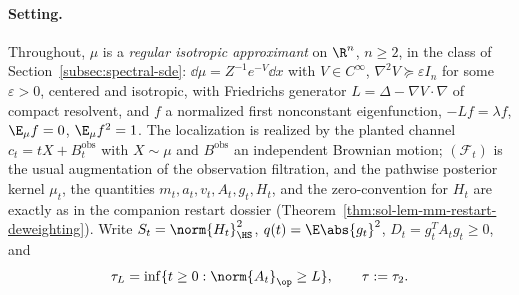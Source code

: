 \documentclass[../main.tex]{subfiles}
\begin{document}
\paragraph{Setting.}
Throughout, $\mu$ is a \emph{regular isotropic approximant} on $\R^n$, $n\ge2$, in the
class of Section~\ref{subsec:spectral-sde}: $\dd\mu=Z^{-1}e^{-V}\dd x$ with
$V\in C^\infty$, $\nabla^2V\succeq\varepsilon I_n$ for some $\varepsilon>0$, centered
and isotropic, with Friedrichs generator $L=\Delta-\nabla V\cdot\nabla$ of compact
resolvent, and $f$ a normalized first nonconstant eigenfunction, $-Lf=\lambda f$,
$\E_\mu f=0$, $\E_\mu f^2=1$.  The localization is realized by the planted channel
$c_t=tX+B_t^{\mathrm{obs}}$ with $X\sim\mu$ and $B^{\mathrm{obs}}$ an independent
Brownian motion; $(\mathcal F_t)$ is the usual augmentation of the observation
filtration, and the pathwise posterior kernel $\mu_t$, the quantities
$m_t,a_t,v_t,A_t,g_t,H_t$, and the zero-convention for $H_t$ are exactly as in the
companion restart dossier (Theorem~\ref{thm:sol-lem-mm-restart-deweighting}).  Write
$S_t=\norm{H_t}_{\HS}^2$, $q(t)=\E\abs{g_t}^2$, $D_t=g_t^TA_tg_t\ge0$, and
\[
  \tau_L=\inf\{t\ge0:\norm{A_t}_\op\ge L\},\qquad \tau:=\tau_2 .
\]
\end{document}
